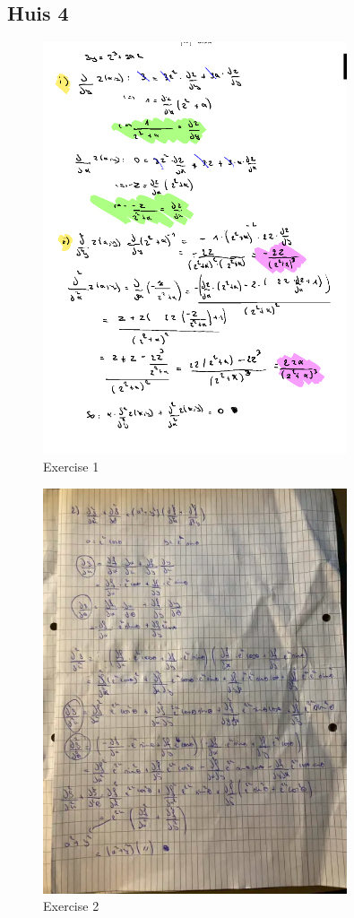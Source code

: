 \documentclass[a4paper]{report}
\begin{document}
\subsection*{Huis 4}

\begin{figure}[H]
	\centering
	\includegraphics[width=0.8\textwidth]{assets/huis_4_ex_1.png}
	\caption{Exercise 1}
	\label{fig:huis_4_ex_1}
\end{figure}

\begin{figure}[H]
	\centering
	\includegraphics[width=0.8\textwidth]{assets/huis_4_ex_2.png}
	\caption{Exercise 2}
	\label{fig:huis_4_ex_2}
\end{figure}
\end{document}
